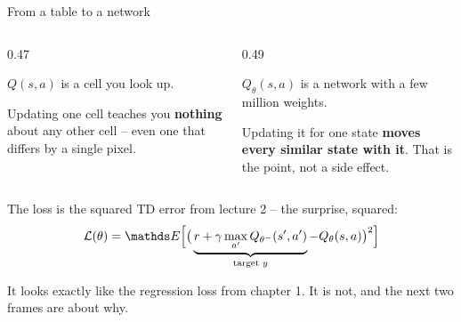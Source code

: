 \documentclass[aspectratio=169]{beamer}
\begin{document}
\begin{frame}{From a table to a network}
  \begin{columns}[T]
    \begin{column}{0.47\textwidth}
      \begin{tcolorbox}[colback=armred!8, colframe=armred, boxrule=0.6pt, arc=2pt,
                        title={\textbf{Tabular}}]
        \small
        $Q(s,a)$ is a cell you look up.

        \vskip 4pt
        Updating one cell teaches you \textbf{nothing} about any other cell -- even one that
        differs by a single pixel.
      \end{tcolorbox}
    \end{column}
    \begin{column}{0.49\textwidth}
      \begin{tcolorbox}[colback=paramgreen!8, colframe=paramgreen, boxrule=0.6pt, arc=2pt,
                        title={\textbf{Approximate}}]
        \small
        $Q_\theta(s,a)$ is a network with a few million weights.

        \vskip 4pt
        Updating it for one state \textbf{moves every similar state with it}. That is the point,
        not a side effect.
      \end{tcolorbox}
    \end{column}
  \end{columns}

  \vskip 10pt
  \small
  The loss is the squared TD error from lecture 2 -- the surprise, squared:
  \[ \mathcal{L}(\theta) = \E\Big[\big(\underbrace{r + \gamma \max_{a'} Q_{\theta^-}(s',a')}_{\text{target } y} - Q_\theta(s,a)\big)^2\Big] \]

  \vskip 6pt
  \begin{center}
    \small
    It looks exactly like the regression loss from chapter 1. It is not, and the next two
    frames are about why.
  \end{center}
\end{frame}
\end{document}
